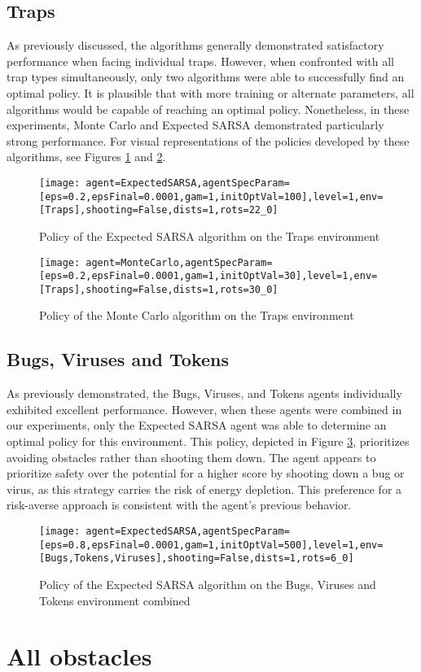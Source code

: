 \subsection{Traps}
As previously discussed, the algorithms generally demonstrated satisfactory performance when facing individual traps. However, when confronted with all trap types simultaneously, only two algorithms were able to successfully find an optimal policy. It is plausible that with more training or alternate parameters, all algorithms would be capable of reaching an optimal policy. Nonetheless, in these experiments, Monte Carlo and Expected SARSA demonstrated particularly strong performance. For visual representations of the policies developed by these algorithms, see Figures \ref{fig:estraps} and \ref{fig:mctraps}.

\begin{figure}[h]
    \centering
    \texttt{[image: agent=ExpectedSARSA,agentSpecParam=[eps=0.2,epsFinal=0.0001,gam=1,initOptVal=100],level=1,env=[Traps],shooting=False,dists=1,rots=22\_0]}
    \caption{Policy of the Expected SARSA algorithm on the Traps environment}
    \label{fig:estraps}
\end{figure}


\begin{figure}[h]
    \centering
    \texttt{[image: agent=MonteCarlo,agentSpecParam=[eps=0.2,epsFinal=0.0001,gam=1,initOptVal=30],level=1,env=[Traps],shooting=False,dists=1,rots=30\_0]}
    \caption{Policy of the Monte Carlo algorithm on the Traps environment}
    \label{fig:mctraps}
\end{figure}

\subsection{Bugs, Viruses and Tokens}
As previously demonstrated, the Bugs, Viruses, and Tokens agents individually exhibited excellent performance. However, when these agents were combined in our experiments, only the Expected SARSA agent was able to determine an optimal policy for this environment. This policy, depicted in Figure \ref{fig:esbvt}, prioritizes avoiding obstacles rather than shooting them down. The agent appears to prioritize safety over the potential for a higher score by shooting down a bug or virus, as this strategy carries the risk of energy depletion. This preference for a risk-averse approach is consistent with the agent's previous behavior.

\begin{figure}[h]
    \centering
    \texttt{[image: agent=ExpectedSARSA,agentSpecParam=[eps=0.8,epsFinal=0.0001,gam=1,initOptVal=500],level=1,env=[Bugs,Tokens,Viruses],shooting=False,dists=1,rots=6\_0]}
	\caption{Policy of the Expected SARSA algorithm on the Bugs, Viruses and Tokens environment combined}    
    \label{fig:esbvt}
\end{figure}

\section{All obstacles}


